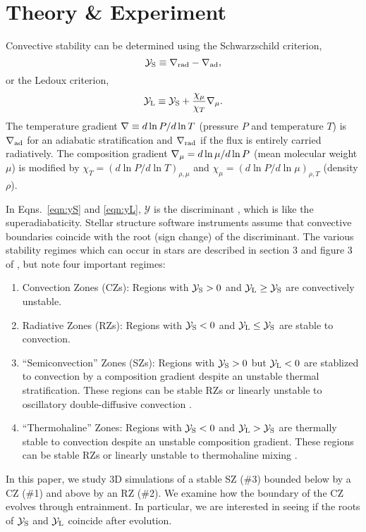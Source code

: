 \section{Theory \& Experiment}
\label{sec:theory}
Convective stability can be determined using the Schwarzschild criterion,
\begin{equation}
    \yS \equiv \gradrad - \gradad,
    \label{eqn:yS}
\end{equation}
or the Ledoux criterion,
\begin{equation}
    \yL \equiv \yS +  \frac{\chi_\mu}{\chi_T}\gradmu.
    \label{eqn:yL}
\end{equation}
The temperature gradient $\nabla \equiv d \ln P / d \ln T$ (pressure $P$ and temperature $T$) is $\nabla_{\rm{ad}}$ for an adiabatic stratification and $\nabla_{\rm{rad}}$ if the flux is entirely carried radiatively.
The composition gradient $\nabla_{\mu} = d\ln\mu/d\ln P$ (mean molecular weight $\mu$) is modified by $\chi_T = (d\ln P / d\ln T)_{\rho,\mu}$ and $\chi_\mu = (d\ln P / d\ln\mu)_{\rho,T}$ (density $\rho$).

In Eqns.~\ref{eqn:yS} and \ref{eqn:yL}, $\mathcal{Y}$ is the discriminant \citep[e.g.,][sec.~2]{mesa4}, which is like the superadiabaticity.
Stellar structure software instruments assume that convective boundaries coincide with the root (sign change) of the discriminant.
The various stability regimes which can occur in stars are described in section 3 and figure 3 of \citet{salaris_cassisi_2017}, but note four important regimes:
\begin{enumerate}
    \item Convection Zones (CZs): Regions with $\mathcal{Y}_{\rm{S}} > 0$ and $\mathcal{Y}_{\rm{L}} \geq \mathcal{Y}_{\rm{S}}$ are convectively unstable.
    \item Radiative Zones (RZs): Regions with $\mathcal{Y}_{\rm{S}} < 0$ and $\mathcal{Y}_{\rm{L}} \leq \mathcal{Y}_{\rm{S}}$ are stable to convection.
    \item ``Semiconvection'' Zones (SZs): Regions with $\mathcal{Y}_{\rm{S}} > 0$ but $\mathcal{Y}_{\rm{L}} < 0$ are stablized to convection by a composition gradient despite an unstable thermal stratification.
        These regions can be stable RZs or linearly unstable to oscillatory double-diffusive convection \citep[ODDC, see][chapters 2 and 4]{garaud_2018}.
    \item ``Thermohaline'' Zones: Regions with $\mathcal{Y}_{\rm{S}} < 0$ and $\mathcal{Y}_{\rm{L}} > \mathcal{Y}_{\rm{S}}$ are thermally stable to convection despite an unstable composition gradient.
        These regions can be stable RZs or linearly unstable to thermohaline mixing \citep[see][chapters 2 and 3]{garaud_2018}.
\end{enumerate}
In this paper, we study 3D simulations of a stable SZ (\#3) bounded below by a CZ (\#1) and above by an RZ (\#2).
We examine how the boundary of the CZ evolves through entrainment.
In particular, we are interested in seeing if the roots of $\mathcal{Y}_{\rm{S}}$ and $\mathcal{Y}_{\rm{L}}$ coincide after evolution.

